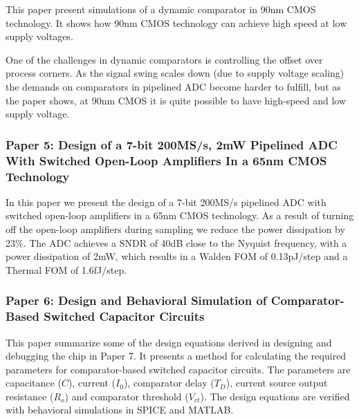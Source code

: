 This paper present simulations of a dynamic comparator in 90nm CMOS
technology. It
shows how 90nm CMOS technology can achieve high speed at low supply
voltages. 

One of the challenges in dynamic comparators is controlling
the offset over process corners. As the signal swing scales down (due
to supply voltage scaling) the demands on comparators in pipelined ADC
become harder to fulfill, but as the paper shows, at 90nm CMOS it is
quite possible to have high-speed and low supply voltage. 



\subsubsection{Paper 5: Design of a 7-bit 200MS/s, 2mW Pipelined ADC With Switched
  Open-Loop Amplifiers In a 65nm CMOS Technology}

In this paper we present the design of a
7-bit 200MS/s pipelined ADC with switched open-loop amplifiers in a
65nm CMOS technology. As a
result of turning
off the open-loop amplifiers during sampling we reduce the power
dissipation by 23\%. The ADC achieves a SNDR
of 40dB close to the Nyquist frequency, with a power dissipation of
2mW, which results in a 
Walden FOM of 0.13pJ/step and a Thermal FOM of 1.6fJ/step.


\subsubsection{Paper 6: Design and Behavioral Simulation of Comparator-Based Switched
  Capacitor Circuits}
This paper summarize some of the design equations derived in designing
and debugging the chip in Paper 7. It presents a method for
calculating the required 
parameters for 
comparator-based switched capacitor circuits. The parameters are
capacitance ($C$), current ($I_0$), comparator delay ($T_D$), current
source output resistance ($R_o$) and comparator threshold 
($V_{ct}$). The design equations
are verified with behavioral simulations in SPICE and MATLAB.

